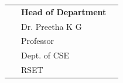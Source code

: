 	\vspace{2cm}

\begin{flushleft}
	
	
	\begin{longtable}{p{5.8cm} p{5.8cm} p{5.8cm}}
		{}& {\textbf{Head of Department}} & {}\\
		{}& {Dr. Preetha K G} & {}\\
		{}& {Professor} & {}\\
		{}&  {Dept. of CSE} & {}\\
		{} ~&{RSET} & {} \\
		
	\end{longtable}
\end{flushleft}


%	
%	
%		
